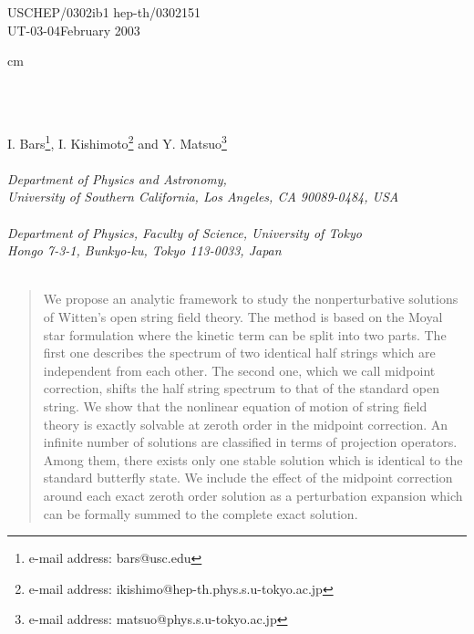 \documentclass[a4paper,aps,preprint,nofootinbib,eqsecnum]{revtex4}
\begin{document}
\thispagestyle{empty}
\begin{flushleft}
USCHEP/0302ib1
\hfill hep-th/0302151 \\
UT-03-04\hfill February 2003 \\
\end{flushleft}

 cm
\bigskip

\begin{center}
 \\
 \noindent{
 }\\
\renewcommand{\thefootnote}{\fnsymbol{footnote}}

\vskip 2cm
{\large
I. Bars\coordHE{}\footnote{e-mail address: bars@usc.edu},
I. Kishimoto\coordHE{}\footnote{e-mail address:
 ikishimo@hep-th.phys.s.u-tokyo.ac.jp} and
Y. Matsuo\coordHE{}\footnote{e-mail address:
 matsuo@phys.s.u-tokyo.ac.jp} } \\
{\it
\noindent{ \bigskip }\\
\coordHE{} Department of Physics and Astronomy,\\
University of Southern California, Los Angeles, CA 90089-0484, USA \\
\noindent{\smallskip  }\\
\coordHE{} Department of Physics, Faculty of Science, University of Tokyo \\
Hongo 7-3-1, Bunkyo-ku, Tokyo 113-0033, Japan\\
\noindent{ \smallskip }\\
}
\bigskip
\end{center}
\begin{abstract}
We propose an analytic framework to study the nonperturbative
solutions of Witten's open string field theory.
The method is based on the Moyal star formulation
where the kinetic term can be split into two parts.
The first one describes the spectrum of two identical half strings
which are independent from each other.
The second one, which we call midpoint correction,
shifts the half string spectrum to that of
the standard open string.  We show that the nonlinear equation
of motion of string field theory is exactly solvable
at zeroth order in the midpoint correction.
An infinite number of solutions are classified in
terms of projection operators. Among them,
there exists only one stable solution which is identical to
the standard butterfly state.
We include the effect of the midpoint
correction around each exact zeroth order
solution as a perturbation expansion which can be
formally summed to the complete exact solution.
\end{abstract}
\vfill
\maketitle
 \vfill\setcounter{footnote}{0} \renewcommand{\thefootnote}{%
 \arabic{footnote}} \newpage
\end{document}
